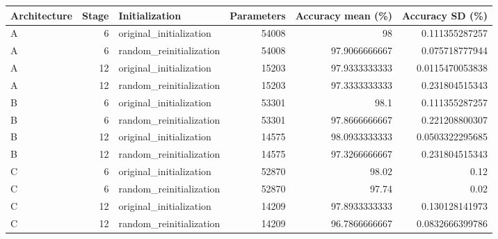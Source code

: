 \begin{tabular}{lrlrrr}
\toprule
Architecture & Stage & Initialization & Parameters & Accuracy mean (\%) & Accuracy SD (\%) \\
\midrule
A & 6 & original\_initialization & 54008 & 98 & 0.111355287257 \\
A & 6 & random\_reinitialization & 54008 & 97.9066666667 & 0.075718777944 \\
A & 12 & original\_initialization & 15203 & 97.9333333333 & 0.0115470053838 \\
A & 12 & random\_reinitialization & 15203 & 97.3333333333 & 0.231804515343 \\
B & 6 & original\_initialization & 53301 & 98.1 & 0.111355287257 \\
B & 6 & random\_reinitialization & 53301 & 97.8666666667 & 0.221208800307 \\
B & 12 & original\_initialization & 14575 & 98.0933333333 & 0.0503322295685 \\
B & 12 & random\_reinitialization & 14575 & 97.3266666667 & 0.231804515343 \\
C & 6 & original\_initialization & 52870 & 98.02 & 0.12 \\
C & 6 & random\_reinitialization & 52870 & 97.74 & 0.02 \\
C & 12 & original\_initialization & 14209 & 97.8933333333 & 0.130128141973 \\
C & 12 & random\_reinitialization & 14209 & 96.7866666667 & 0.0832666399786 \\
\bottomrule
\end{tabular}
